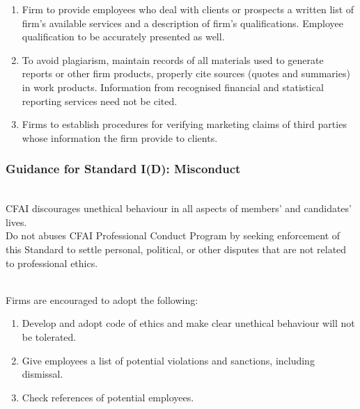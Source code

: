 \begin{remark} 
\begin{enumerate}[label=\roman*.]
\setlength{\itemsep}{0pt}
\item Firm to provide employees who deal with clients or prospects a written list of firm's available services and a description of firm's qualifications. Employee qualification to be accurately presented as well.
\item To avoid plagiarism, maintain records of all materials used to generate reports or other firm products, properly cite sources (quotes and summaries) in work products. Information from recognised financial and statistical reporting services need not be cited.
\item Firms to establish procedures for verifying marketing claims of third parties whose information the firm provide to clients.
\end{enumerate}
\end{remark}

\subsubsection{Guidance for Standard I(D): Misconduct}

\begin{remark} \\
CFAI discourages unethical behaviour in all aspects of members' and candidates' lives.\\
Do not abuses CFAI Professional Conduct Program by seeking enforcement of this Standard to settle personal, political, or other disputes that are not related to professional ethics.
\end{remark}

\begin{remark} \\
Firms are encouraged to adopt the following:
\begin{enumerate}[label=\roman*.]
\setlength{\itemsep}{0pt}
\item Develop and adopt code of ethics and make clear unethical behaviour will not be tolerated.
\item Give employees a list of potential violations and sanctions, including dismissal.
\item Check references of potential employees.
\end{enumerate}
\end{remark}

